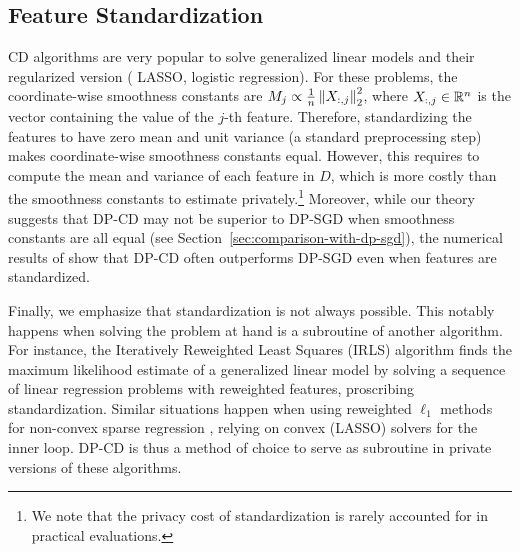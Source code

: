 \subsection{Feature Standardization}
\label{sec:data-standardization}

CD algorithms are very popular to solve generalized linear
models \citep{friedman2010Regularization} and their regularized version (\eg
LASSO, logistic regression).
For these problems, the coordinate-wise smoothness constants are
$M_j \propto \frac 1n \left \lVert X_{:,j} \right \rVert_2^2$, where $X_{:,j} \in \mathbb R^{n}$
is the vector containing the value of the $j$-th feature. Therefore, standardizing the features to have zero mean and
unit variance (a standard preprocessing step) makes coordinate-wise smoothness
constants equal. However, this requires to compute the
mean and variance of each feature in $D$, which is more
costly than the smoothness
constants to estimate privately.\footnote{We note that the privacy cost of
standardization is rarely accounted for in practical evaluations.}
Moreover, while our theory suggests that DP-CD may not be superior to DP-SGD
when smoothness constants are all equal (see
Section~\ref{sec:comparison-with-dp-sgd}), the
numerical results of  show that DP-CD often
outperforms DP-SGD even when features are standardized.

Finally, we emphasize that standardization is not always possible.
This notably happens when solving the problem at hand is a subroutine of another algorithm.
For instance, the Iteratively Reweighted Least Squares (IRLS) algorithm
\citep{holland1977Robust} finds the maximum likelihood estimate of a
generalized linear model by solving a sequence of linear
regression problems with reweighted features, proscribing standardization.
Similar situations happen when using reweighted $\ell_1$ methods for
non-convex sparse regression \citep{Candes_Wakin_Boyd08}, relying on convex (LASSO) solvers for the inner loop.
DP-CD is thus a method of choice to serve as subroutine in private versions of these algorithms.

